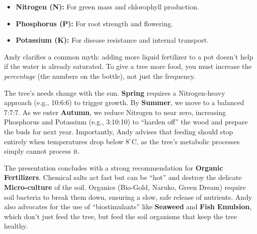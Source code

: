 \begin{itemize}
    \item \textbf{Nitrogen (N):} For green mass and chlorophyll production.

    \item \textbf{Phosphorus (P):} For root strength and flowering.

    \item \textbf{Potassium (K):} For disease resistance and internal transport.
\end{itemize}

Andy clarifies a common myth: adding more liquid fertilizer to a pot doesn't help if the water is already saturated.
To give a tree more food, you must increase the \textit{percentage} (the numbers on the bottle), not just the frequency.

\noindent
The tree's needs change with the sun.
\textbf{Spring} requires a Nitrogen\--heavy approach (e.g., 10:6:6) to trigger growth.
By \textbf{Summer}, we move to a balanced 7:7:7.
As we enter \textbf{Autumn}, we reduce Nitrogen to near zero, increasing Phosphorus and Potassium (e.g., 3:10:10) to ``harden off'' the wood and prepare the buds for next year.
Importantly, Andy advises that feeding should stop entirely when temperatures drop below $8^\circ\text{C}$, as the tree's metabolic processes simply cannot process it.

\noindent
The presentation concludes with a strong recommendation for \textbf{Organic Fertilizers}.
Chemical salts act fast but can be ``hot'' and destroy the delicate \textbf{Micro\--culture} of the soil.
Organics (Bio\--Gold, Naruko, Green Dream) require soil bacteria to break them down, ensuring a slow, safe release of nutrients.
Andy also advocates for the use of ``biostimulants'' like \textbf{Seaweed} and \textbf{Fish Emulsion}, which don't just feed the tree, but feed the soil organisms that keep the tree healthy.
\vfill
\closearticle

\clearpage


